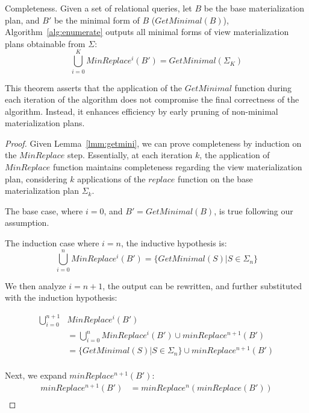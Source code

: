\begin{thm}\label{theorem:completeness}{Completeness.}
Given a set of relational queries, let $B$ be the base materialization plan, and $B'$ be the minimal form of $B$ ($GetMinimal(B)$),
Algorithm~\ref{alg:enumerate} outputs all minimal forms of view materialization plans obtainable from $\Sigma$:
        \[ \bigcup_{i=0}^{K}MinReplace^i(B') =  GetMinimal(\Sigma_K) \]
\end{thm}

This theorem asserts that the application of the $GetMinimal$ function during each iteration of the algorithm does not compromise the final correctness of the algorithm. Instead, it enhances efficiency by early pruning of non-minimal materialization plans.
    

\begin{proof}
Given Lemma~\ref {lmm:getmini}, we can prove completeness by induction on the $MinReplace$ step. 
Essentially, at each iteration $k$, the application of $MinReplace$ function maintains completeness regarding the view materialization plan, 
considering $k$ applications of the $replace$ function on the base materialization plan $\Sigma_k$.

 The base case, where $i = 0$, and $B' = GetMinimal(B)$, is true following our assumption.

 The induction case where $i=n$, the inductive hypothesis is:
\[ \bigcup_{i=0}^{n}MinReplace^i(B') =  \{ GetMinimal(S)  | S \in \Sigma_n \} \]


 We then analyze $i=n+1$, the output can be rewritten, and further substituted with the induction hypothesis:

\begin{align*}
    \bigcup_{i=0}^{n+1} & MinReplace^i(B') \\
    & = \bigcup_{i=0}^{n}MinReplace^i(B') \cup minReplace^{n+1}(B') \\
    & = \{ GetMinimal(S)  | S \in \Sigma_n \}
                                           \cup  minReplace^{n+1}(B') \\
\end{align*}

Next, we expand $minReplace^{n+1}(B')$: 
\begin{align*}
    minReplace^{n+1}(B') & = minReplace^n(minReplace(B')) \\
\end{align*}


\end{proof}

